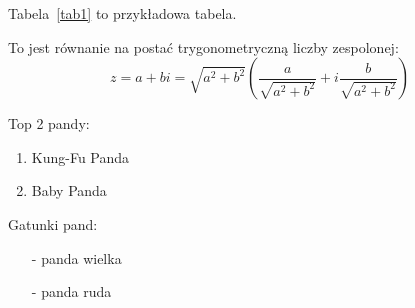 \vspace{2em}

Tabela~\ref{tab1} to przykładowa tabela. 



\vspace{2em}

To jest równanie na postać trygonometryczną liczby zespolonej:
$$z = a + bi = \sqrt{a^2 + b^2}(\frac{a}{\sqrt{a^2 + b^2}} + i \frac{b}{\sqrt{a^2 + b^2}})$$

\vspace{2em}


Top 2 pandy:
\begin{enumerate}
    \item Kung-Fu Panda
    \item Baby Panda
\end{enumerate}


\vspace{2em}


Gatunki pand:
\begin{itemize}
    \item[-] panda wielka
    \item[-] panda ruda
\end{itemize}



